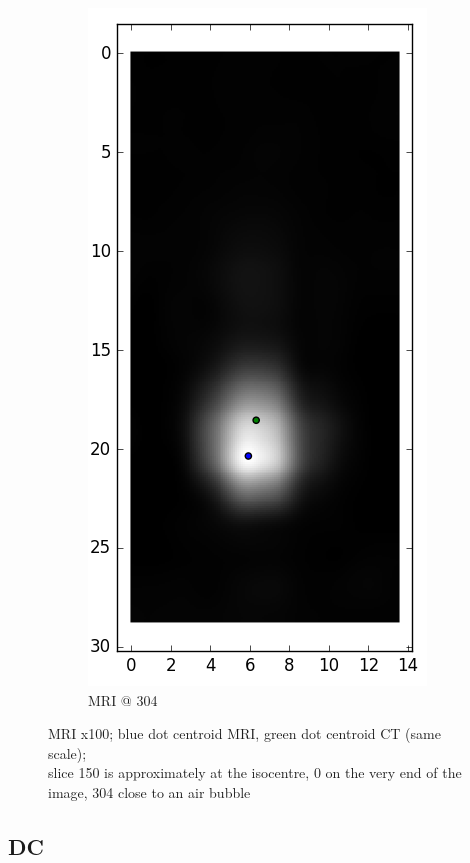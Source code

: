 \documentclass[parskip,bibtotoc,final,twoside=false,titlepage,a4paper,english,12pt,titlepage,a4paper]{scrbook}
\begin{document}
\begin{figure}[!tbp]
\begin{subfigure}[b]{0.32\textwidth}
    \includegraphics[scale=0.55]{python/centroid/MR_x100@304_centroids.png}
    \caption{MRI @ 304}
    \label{fig:MR_x100_centroids@304}
  \end{subfigure}
  \caption{MRI x100; blue dot centroid MRI, green dot centroid CT (same scale);\\ slice 150 is approximately at the isocentre, 0 on the very end of the image, 304 close to an air bubble}
  \label{fig:MR_x100_centroids}
\end{figure}

\vspace{2cm}

\subsection{DC}
\end{document}
